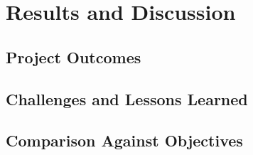 \chapter{Results and Discussion}
\section{Project Outcomes}
\section{Challenges and Lessons Learned}
\section{Comparison Against Objectives}
